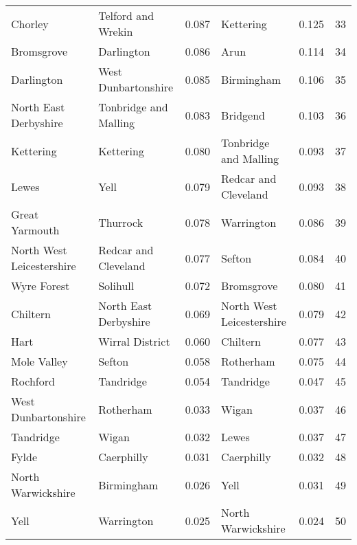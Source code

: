 \begin{tabular}{llrlrr}
Chorley                   &         Telford and Wrekin &  0.087 &                  Kettering &   0.125 &    33 \\
Bromsgrove                &                 Darlington &  0.086 &                       Arun &   0.114 &    34 \\
Darlington                &        West Dunbartonshire &  0.085 &                 Birmingham &   0.106 &    35 \\
North East Derbyshire     &      Tonbridge and Malling &  0.083 &                   Bridgend &   0.103 &    36 \\
Kettering                 &                  Kettering &  0.080 &      Tonbridge and Malling &   0.093 &    37 \\
Lewes                     &                       Yell &  0.079 &       Redcar and Cleveland &   0.093 &    38 \\
Great Yarmouth            &                   Thurrock &  0.078 &                 Warrington &   0.086 &    39 \\
North West Leicestershire &       Redcar and Cleveland &  0.077 &                     Sefton &   0.084 &    40 \\
Wyre Forest               &                   Solihull &  0.072 &                 Bromsgrove &   0.080 &    41 \\
Chiltern                  &      North East Derbyshire &  0.069 &  North West Leicestershire &   0.079 &    42 \\
Hart                      &            Wirral District &  0.060 &                   Chiltern &   0.077 &    43 \\
Mole Valley               &                     Sefton &  0.058 &                  Rotherham &   0.075 &    44 \\
Rochford                  &                  Tandridge &  0.054 &                  Tandridge &   0.047 &    45 \\
West Dunbartonshire       &                  Rotherham &  0.033 &                      Wigan &   0.037 &    46 \\
Tandridge                 &                      Wigan &  0.032 &                      Lewes &   0.037 &    47 \\
Fylde                     &                 Caerphilly &  0.031 &                 Caerphilly &   0.032 &    48 \\
North Warwickshire        &                 Birmingham &  0.026 &                       Yell &   0.031 &    49 \\
Yell                      &                 Warrington &  0.025 &         North Warwickshire &   0.024 &    50 \\
\bottomrule
\end{tabular}
